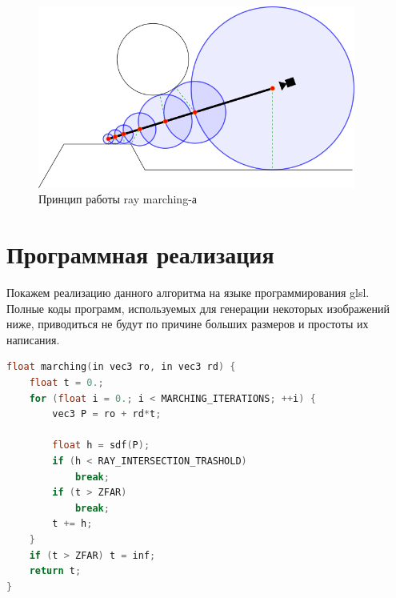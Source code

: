 \documentclass[12pt,a4paper]{article}
\begin{document}
\begin{figure}[H]
    \centering
    \includegraphics[height=6cm]{marching_principle}
    \caption{Принцип работы ray marching-а}
\end{figure}


\section{Программная реализация}
Покажем реализацию данного алгоритма на языке программирования glsl. Полные
коды программ, используемых для генерации некоторых изображений ниже,
приводиться не будут по причине больших размеров и простоты их написания.
\begin{lstlisting}[language=c++]
float marching(in vec3 ro, in vec3 rd) {
    float t = 0.;
    for (float i = 0.; i < MARCHING_ITERATIONS; ++i) {
        vec3 P = ro + rd*t;

        float h = sdf(P);
        if (h < RAY_INTERSECTION_TRASHOLD)
            break;
        if (t > ZFAR)
            break;
        t += h;
    }
    if (t > ZFAR) t = inf;
    return t;
}
\end{lstlisting}
\end{document}
